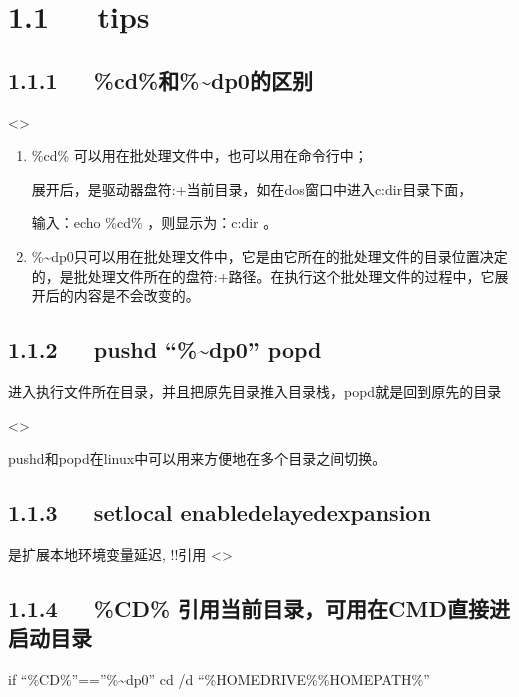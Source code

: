 \documentclass[letterpaper,12pt,english]{sphinxmanual}
\begin{document}
\section{1.1   tips}
\label{\detokenize{001software/002usage/bat:tips}}

\subsection{1.1.1   \%cd\%和\%\textasciitilde{}dp0的区别}
\label{\detokenize{001software/002usage/bat:cd-dp0}}
\textless{}\textgreater{}
\begin{enumerate}
%
\item {} 
\%cd\% 可以用在批处理文件中，也可以用在命令行中；

展开后，是驱动器盘符:+当前目录，如在dos窗口中进入c:dir目录下面，

输入：echo \%cd\% ，则显示为：c:dir 。

\item {} 
\%\textasciitilde{}dp0只可以用在批处理文件中，它是由它所在的批处理文件的目录位置决定的，是批处理文件所在的盘符:+路径。在执行这个批处理文件的过程中，它展开后的内容是不会改变的。

\end{enumerate}


\subsection{1.1.2   pushd “\%\textasciitilde{}dp0” popd}
\label{\detokenize{001software/002usage/bat:pushd-dp0-popd}}
进入执行文件所在目录，并且把原先目录推入目录栈，popd就是回到原先的目录

\textless{}\textgreater{}

pushd和popd在linux中可以用来方便地在多个目录之间切换。


\subsection{1.1.3   setlocal enabledelayedexpansion}
\label{\detokenize{001software/002usage/bat:setlocal-enabledelayedexpansion}}
是扩展本地环境变量延迟, !!引用
\textless{}\textgreater{}


\subsection{1.1.4   \%CD\% 引用当前目录，可用在CMD直接进启动目录}
\label{\detokenize{001software/002usage/bat:cd-cmd}}
if “\%CD\%”==”\%\textasciitilde{}dp0” cd /d “\%HOMEDRIVE\%\%HOMEPATH\%”
\end{document}
